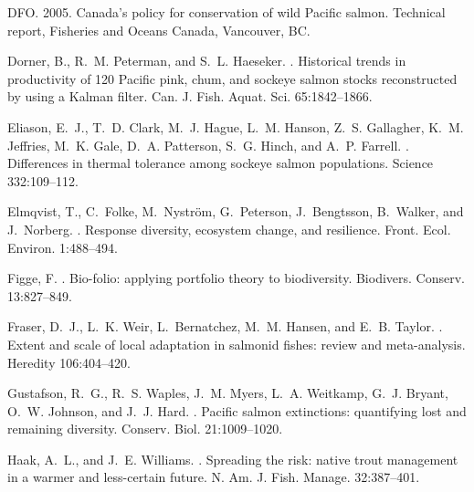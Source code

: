 \documentclass[12pt,english]{article}
\begin{document}
\begin{spacing}{1.9}
\begin{thebibliography}{64}
DFO. 2005.
\newblock Canada's policy for conservation of wild {Pacific} salmon.
\newblock Technical report, Fisheries and Oceans Canada, Vancouver, BC.

Dorner, B., R.~M. Peterman, and S.~L. Haeseker.
.
\newblock Historical trends in productivity of 120 {Pacific} pink, chum, and
  sockeye salmon stocks reconstructed by using a {Kalman} filter.
\newblock Can. J. Fish. Aquat. Sci. 65:1842--1866.

Eliason, E.~J., T.~D. Clark, M.~J. Hague, L.~M. Hanson, Z.~S. Gallagher, K.~M.
  Jeffries, M.~K. Gale, D.~A. Patterson, S.~G. Hinch, and A.~P. Farrell.
.
\newblock Differences in thermal tolerance among sockeye salmon populations.
\newblock Science 332:109--112.

Elmqvist, T., C.~Folke, M.~Nystr{\"o}m, G.~Peterson, J.~Bengtsson, B.~Walker,
  and J.~Norberg.
.
\newblock Response diversity, ecosystem change, and resilience.
\newblock Front. Ecol. Environ. 1:488--494.

Figge, F.
.
\newblock Bio-folio: applying portfolio theory to biodiversity.
\newblock Biodivers. Conserv. 13:827--849.

Fraser, D.~J., L.~K. Weir, L.~Bernatchez, M.~M. Hansen, and E.~B. Taylor.
.
\newblock Extent and scale of local adaptation in salmonid fishes: review and
  meta-analysis.
\newblock Heredity 106:404--420.

Gustafson, R.~G., R.~S. Waples, J.~M. Myers, L.~A. Weitkamp, G.~J. Bryant,
  O.~W. Johnson, and J.~J. Hard.
.
\newblock Pacific salmon extinctions: quantifying lost and remaining diversity.
\newblock Conserv. Biol. 21:1009--1020.

Haak, A.~L., and J.~E. Williams.
.
\newblock Spreading the risk: native trout management in a warmer and
  less-certain future.
\newblock N. Am. J. Fish. Manage. 32:387--401.


\end{thebibliography}
\end{spacing}
\end{document}
